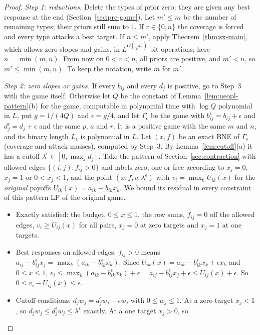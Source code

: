 \begin{proof}
\emph{Step 1: reductions.} Delete the types of prior zero; they are given any best response at the end
(Section~\ref{sec:pre-game}). Let $m'\le m$ be the number of remaining types; their priors still sum to
$1$. If $r\in\{0,n\}$ the coverage is forced and every type attacks a best target. If $n\le m'$, apply
Theorem~\ref{thm:sx-main}, which allows zero slopes and gains, in $L^{O(\sqrt n)}$ bit operations; here
$n=\min(m,n)$. From now on $0<r<n$, all priors are positive, and $m'<n$, so $m'\le\min(m,n)$. To keep the
notation, write $m$ for $m'$.

\emph{Step 2: zero slopes or gains.} If every $b_{ij}$ and every $d_j$ is positive, go to Step~3 with
the game itself. Otherwise let $Q$ be the constant of Lemma~\ref{lem:ueopl-pattern}(b) for the game,
computable in polynomial time with $\log Q$ polynomial in $L$, put $g=1/(4Q)$ and $\epsilon=g/4$, and let
$\Gamma_\epsilon$ be the game with $b^\epsilon_{ij}=b_{ij}+\epsilon$ and $d^\epsilon_j=d_j+\epsilon$ and the
same $p$, $a$ and $r$. It is a positive game with the same $m$ and $n$, and its binary length $L_\epsilon$
is polynomial in $L$. Let $(x,f)$ be an exact BNE of $\Gamma_\epsilon$ (coverage and attack masses),
computed by Step~3. By Lemma~\ref{lem:cutoff}(a) it has a cutoff
$\lambda^\epsilon\in[0,\max_jd^\epsilon_j]$. Take the pattern of Section~\ref{sec:contraction} with
allowed edges $\{(i,j):f_{ij}>0\}$ and labels zero, one or free according to $x_j=0$, $x_j=1$ or
$0<x_j<1$, and the point $(x,f,v,\lambda^\epsilon)$ with $v_i=\max_kU_{ik}(x)$ for the \emph{original}
payoffs $U_{ik}(x)=a_{ik}-b_{ik}x_k$. We bound its residual in every constraint of this pattern LP of the
original game.
\begin{itemize}[nosep]
\item Exactly satisfied: the budget, $0\le x\le1$, the row sums, $f_{ij}=0$ off the allowed edges,
$v_i\ge U_{ij}(x)$ for all pairs, $x_j=0$ at zero targets and $x_j=1$ at one targets.
\item Best responses on allowed edges: $f_{ij}>0$ means
$a_{ij}-b^\epsilon_{ij}x_j=\max_k(a_{ik}-b^\epsilon_{ik}x_k)$. Since
$U_{ik}(x)=a_{ik}-b^\epsilon_{ik}x_k+\epsilon x_k$ and $0\le x\le1$,
$v_i\le\max_k(a_{ik}-b^\epsilon_{ik}x_k)+\epsilon=a_{ij}-b^\epsilon_{ij}x_j+\epsilon\le U_{ij}(x)+\epsilon$. So
$0\le v_i-U_{ij}(x)\le\epsilon$.
\item Cutoff conditions: $d_jw_j=d^\epsilon_jw_j-\epsilon w_j$ with $0\le w_j\le1$. At a zero target
$x_j<1$, so $d_jw_j\le d^\epsilon_jw_j\le\lambda^\epsilon$ exactly. At a one target $x_j>0$, so

\end{itemize}
\end{proof}
